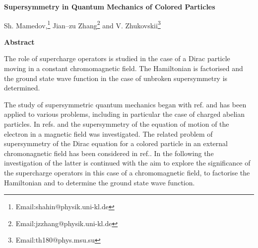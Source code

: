 \documentclass[a4paper,12pt,a4]{article}
\begin{document}
\setlength{\textheight}{9.4in}
\setlength{\topmargin}{-0.6in}
\setlength{\oddsidemargin}{0.2in}
\setlength{\evensidemargin}{0.5in}
\renewcommand{\thefootnote}{\fnsymbol{footnote}}
\begin{center}
{\Large {\bf Supersymmetry in Quantum Mechanics of Colored Particles}}
\vspace{0.8cm}

{Sh. Mamedov,\raisebox{0.8ex}{\small a,b}\footnote[1]
{ Email:shahin@physik.uni-kl.de}
Jian--zu Zhang\raisebox{0.8ex}{\small a,c}\footnote[2]
{Email:jzzhang@physik.uni-kl.de}
and V. Zhukovskii\raisebox{0.8ex}{\small d}\footnote[3]
{Email:th180@phys.msu.su}\\






}
\end{center}
\vspace{0.3cm}

{\centerline {\bf Abstract}}
\noindent

The role of supercharge operators is studied in the case
of a Dirac particle moving in a constant
chromomagnetic field. The Hamiltonian is factorised and the ground state
wave function in the case of unbroken supersymmetry
is determined.






\vspace{2cm}
The study of supersymmetric quantum mechanics began with
 ref.\cite{1} and has been  applied to
various problems, including in particular the case of
charged abelian particles\cite{2,3,4,5,6,7}.
In refs.\cite{2} and \cite{3} the supersymmetry of
the equation of motion of the electron in
a magnetic field was investigated. The related
problem of supersymmetry of the Dirac equation
for a colored particle in an external
chromonagnetic field has been considered in
ref.\cite{8}. In the following the investigation of the
latter is continued with the aim to explore the significance of
the supercharge operators in this case of
a chromomagnetic field, to factorise the Hamiltonian
and to determine the ground state
wave function.
\end{document}
